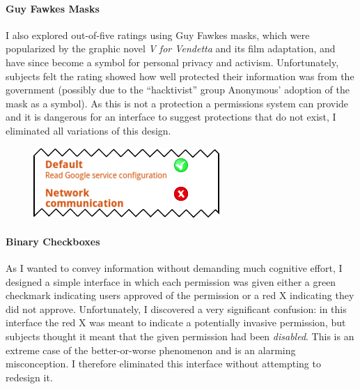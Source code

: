 \documentclass[11pt]{article}
\begin{document}
\paragraph{Guy Fawkes Masks}
\label{s-sec-masks}

I also explored out-of-five ratings using Guy Fawkes masks, which 
were popularized by the graphic novel \emph{V for Vendetta} and its
film adaptation, and have since become a symbol for personal
privacy and activism.
\label{ss-sec-masks-r1}
Unfortunately, subjects felt the
rating showed how well protected their information was from the government 
(possibly due to the ``hacktivist'' group Anonymous' adoption of the mask as a symbol). 
As this is not a protection a permissions system can provide and it is dangerous for an
interface to suggest protections that do not exist, I eliminated all
variations of this design.

\newpage

\begin{figure}
\begin{center}
\includegraphics[width=.9\linewidth]{candidate-img/checkboxes/checkboxesR1.png}
\end{center}
\end{figure}

\paragraph{Binary Checkboxes}
\label{s-sec-checkbox}

As I wanted to convey information without demanding much cognitive effort,
I designed a simple interface in which 
each permission was given either a green 
checkmark indicating users approved of the permission or a red X indicating 
they did not approve.
\label{ss-sec-binary-r1}
Unfortunately, I discovered a very significant confusion: in this interface
the red X was meant to indicate a potentially invasive permission, but 
subjects thought it meant that the given permission had been \emph{disabled}. This
is an extreme case of the better-or-worse phenomenon and is an 
alarming misconception. I therefore eliminated this interface without attempting to 
redesign it.
\end{document}
